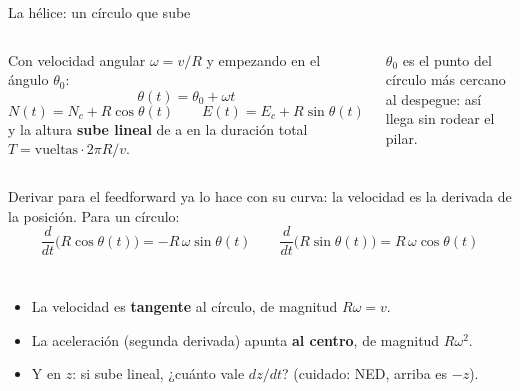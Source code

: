 

\begin{frame}{La hélice: un círculo que sube}
  \begin{columns}[c]
    \centering
    \small
    Con velocidad angular $\omega = v/R$ y empezando en el ángulo $\theta_0$:
    \[ \theta(t) = \theta_0 + \omega t \]
    \[ N(t) = N_c + R\cos\theta(t) \qquad E(t) = E_c + R\sin\theta(t) \]
    y la altura \textbf{sube lineal} de  a  en la duración total
    $T = \text{vueltas}\cdot 2\pi R / v$.
    \vspace{0.3em}

    \footnotesize $\theta_0$ es el punto del círculo más cercano al despegue: así llega sin rodear el pilar.
  \end{columns}
\end{frame}

\begin{frame}{Derivar para el feedforward}
  \small {} ya lo hace con su curva: la velocidad es la derivada de la posición.
  Para un círculo:
  \[
    \frac{d}{dt}\bigl(R\cos\theta(t)\bigr) = -R\,\omega\sin\theta(t)
    \qquad
    \frac{d}{dt}\bigl(R\sin\theta(t)\bigr) = R\,\omega\cos\theta(t)
  \]
  \begin{columns}[c]
    \begin{itemize}
      \item La velocidad es \textbf{tangente} al círculo, de magnitud $R\omega = v$.
      \item La aceleración (segunda derivada) apunta \textbf{al centro}, de magnitud $R\omega^2$.
      \item Y en $z$: si sube lineal, ¿cuánto vale $dz/dt$? (cuidado: NED, arriba es $-z$).
    \end{itemize}
  \end{columns}
\end{frame}

